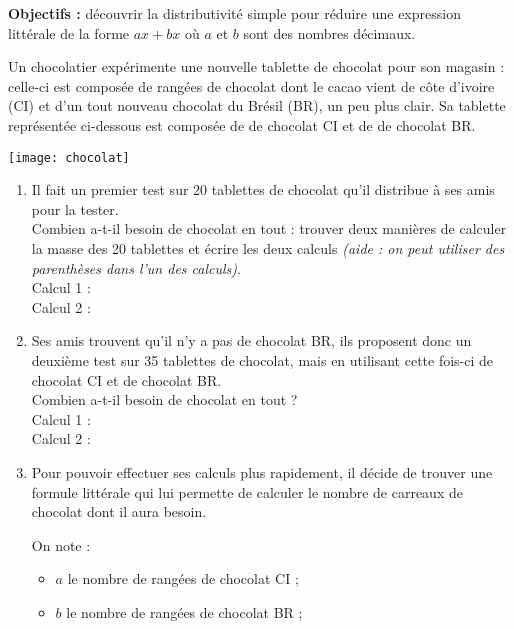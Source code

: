 \begin{activite}
   {\bf Objectifs :} découvrir la distributivité simple pour réduire une expression littérale de la forme $ax+bx$ où $a$ et $b$ sont des nombres décimaux.
   \begin{QCM}
      Un chocolatier expérimente une nouvelle tablette de chocolat pour son magasin : celle-ci est composée de rangées de chocolat dont le cacao vient de côte d'ivoire (CI) et d'un tout nouveau chocolat du Brésil (BR), un peu plus clair. Sa tablette représentée ci-dessous est composée de  de chocolat CI et de  de chocolat BR.
      \begin{center}
         \texttt{[image: chocolat]}
      \end{center}
      \begin{enumerate}
         \item Il fait un premier test sur 20 tablettes de chocolat qu'il distribue à ses amis pour la tester. \\
            Combien a-t-il besoin de chocolat en tout : trouver deux manières de calculer la masse des 20 tablettes et écrire les deux calculs {\it (aide : on peut utiliser des parenthèses dans l'un des calculs)}. \\ [3mm]
            Calcul 1 : \pointilles \\ [3mm]
            Calcul 2 : \pointilles \bigskip
         \item Ses amis trouvent qu'il n'y a pas de chocolat BR, ils proposent donc un deuxième test sur 35 tablettes de chocolat, mais en utilisant cette fois-ci  de chocolat CI et  de chocolat BR. \\
            Combien a-t-il besoin de chocolat en tout ? \\ [3mm]
            Calcul 1 : \pointilles \\ [3mm]
            Calcul 2 : \pointilles \bigskip
         \item Pour pouvoir effectuer ses calculs plus rapidement, il décide de trouver une formule littérale qui lui permette de calculer le nombre de carreaux de chocolat dont il aura besoin. \\
         \begin{minipage}{8cm}
            On note :
            \begin{itemize}
               \item $a$ le nombre de rangées de chocolat CI ;
               \item $b$ le nombre de rangées de chocolat BR ;

\end{itemize}
\end{minipage}
\end{enumerate}
\end{QCM}
\end{activite}
